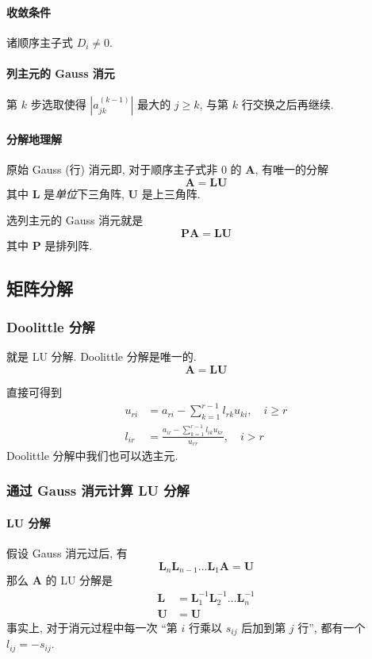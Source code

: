\documentclass{ctexart}
\begin{document}
\paragraph{收敛条件}
    诸顺序主子式 $D_i \neq 0$.\par
\paragraph{列主元的 Gauss 消元}
    第 $k$ 步选取使得 $|a^{(k-1)}_{jk}|$ 最大的 $j \ge k$, 与第 $k$ 行交换之后再继续.
\paragraph{分解地理解}
    原始 Gauss (行) 消元即, 对于顺序主子式非 0 的 $\mathbf{A}$, 有唯一的分解 \[
        \mathbf{A} = \mathbf{L} \mathbf{U}\]
    其中 $\mathbf{L}$ 是\emph{单位}下三角阵, $\mathbf{U}$ 是上三角阵.\par
    选列主元的 Gauss 消元就是 \[
        \mathbf{P} \mathbf{A} = \mathbf{L} \mathbf{U}\]
    其中 $\mathbf{P}$ 是排列阵.

\subsection{矩阵分解}
\subsubsection{Doolittle 分解}
    就是 LU 分解. Doolittle 分解是唯一的. \[
        \mathbf{A} = \mathbf{L} \mathbf{U}
    \]
    \par
    直接可得到 \begin{align*}
        u_{ri} &= a_{ri} - \sum_{k=1}^{r-1} l_{rk} u_{ki},\quad i \ge r\\
        l_{ir} &= \frac{a_{ir} - \sum_{k=1}^{r-1} l_{ik} u_{kr}}{u_{rr}},\quad i > r
    \end{align*}
    Doolittle 分解中我们也可以选主元.
\subsubsection{通过 Gauss 消元计算 LU 分解}
\paragraph{LU 分解}
    假设 Gauss 消元过后, 有\[
        \mathbf{L}_n \mathbf{L}_{n-1} \ldots \mathbf{L}_1 \mathbf{A} = \mathbf{U}\]
    那么 $\mathbf{A}$ 的 LU 分解是 \begin{align*}
        \mathbf{L} &= \mathbf{L}_1^{-1} \mathbf{L}_2^{-1} \ldots \mathbf{L}_n^{-1}\\
        \mathbf{U} &= \mathbf{U}
    \end{align*}
    事实上, 对于消元过程中每一次 ``第 $i$ 行乘以 $s_{ij}$ 后加到第 $j$ 行'',
    都有一个 $l_{ij} = -s_{ij}$.
\end{document}

